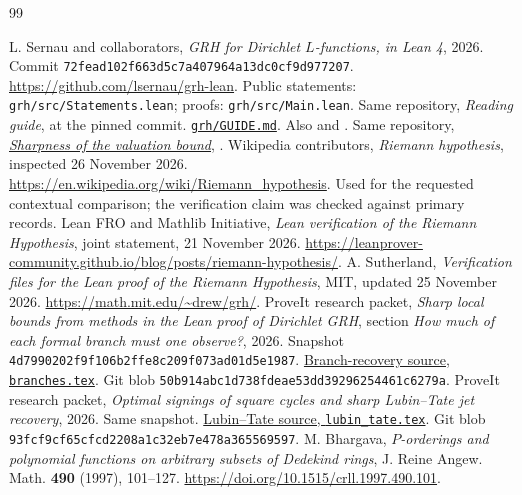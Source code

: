 \documentclass[11pt]{article}
\theoremstyle{definition}
\newcommand{\grhsha}{\texttt{72fead102f663d5c7a407964a13dc0cf9d977207}}
\newcommand{\pisha}{\texttt{4d7990202f9f106b2ffe8c209f073ad01d5e1987}}
\begin{document}
\begin{thebibliography}{99}
\small\raggedright
{} L. Sernau and collaborators, \emph{GRH for Dirichlet $L$-functions, in Lean 4}, 2026. Commit \grhsha. \url{https://github.com/lsernau/grh-lean}. Public statements: \texttt{grh/src/Statements.lean}; proofs: \texttt{grh/src/Main.lean}.
 Same repository, \emph{Reading guide}, at the pinned commit. \href{https://github.com/lsernau/grh-lean/blob/72fead102f663d5c7a407964a13dc0cf9d977207/grh/GUIDE.md}{\texttt{grh/GUIDE.md}}. Also  and .
 Same repository, \href{https://github.com/lsernau/grh-lean/blob/72fead102f663d5c7a407964a13dc0cf9d977207/grh/src/New/Derivatives/Sharpness/BoundAttained.lean}{\emph{Sharpness of the valuation bound}}, .
 Wikipedia contributors, \emph{Riemann hypothesis}, inspected 26 November 2026. \url{https://en.wikipedia.org/wiki/Riemann_hypothesis}. Used for the requested contextual comparison; the verification claim was checked against primary records.
 Lean FRO and Mathlib Initiative, \emph{Lean verification of the Riemann Hypothesis}, joint statement, 21 November 2026. \url{https://leanprover-community.github.io/blog/posts/riemann-hypothesis/}.
 A. Sutherland, \emph{Verification files for the Lean proof of the Riemann Hypothesis}, MIT, updated 25 November 2026. \url{https://math.mit.edu/~drew/grh/}.
 ProveIt research packet, \emph{Sharp local bounds from methods in the Lean proof of Dirichlet GRH}, section \emph{How much of each formal branch must one observe?}, 2026. Snapshot \pisha. \href{https://github.com/VladimirReshetnikov/ProveIt/blob/4d7990202f9f106b2ffe8c209f073ad01d5e1987/Analysis/GeneralizedRiemannHypothesis/Research/grh_transfers_lubin_tate_and_graph_towers/branches.tex}{Branch-recovery source, \texttt{branches.tex}}. Git blob \texttt{50b914abc1d738fdeae53dd39296254461c6279a}.
 ProveIt research packet, \emph{Optimal signings of square cycles and sharp Lubin--Tate jet recovery}, 2026. Same snapshot. \href{https://github.com/VladimirReshetnikov/ProveIt/blob/4d7990202f9f106b2ffe8c209f073ad01d5e1987/Analysis/GeneralizedRiemannHypothesis/Research/grh_transfers_cycle_signings_and_lubin_tate/lubin_tate.tex}{Lubin--Tate source, \texttt{lubin\_tate.tex}}. Git blob \texttt{93fcf9cf65cfcd2208a1c32eb7e478a365569597}.
 M. Bhargava, \emph{$P$-orderings and polynomial functions on arbitrary subsets of Dedekind rings}, J. Reine Angew. Math. \textbf{490} (1997), 101--127. \url{https://doi.org/10.1515/crll.1997.490.101}.

\end{thebibliography}
\end{document}
